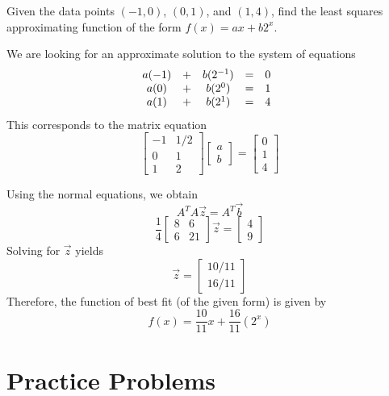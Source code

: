\documentclass{ximera}
\begin{document}
 \begin{example}\label{ex:leastSq3}
     Given the data points $(-1, 0)$, $(0,1)$, and $(1,4)$, find the least squares approximating function of the form $f(x)=ax+b2^x$.
\begin{explanation}
    We are looking for an approximate solution to the system of equations
    $$\begin{matrix}a(-1)&+&b(2^{-1})&=&0\\a(0)&+&b(2^{0})&=&1\\a(1)&+&b(2^{1})&=&4\end{matrix}\\$$
    This corresponds to the matrix equation
    $$\begin{bmatrix}-1&1/2\\0&1\\1&2\end{bmatrix}\begin{bmatrix}a\\b\end{bmatrix}=\begin{bmatrix}0\\1\\4\end{bmatrix}$$

    Using the normal equations, we obtain
    $$A^TA\vec{z}=A^T\vec{b}$$
    $$\frac{1}{4}\begin{bmatrix}8&6\\6&21\end{bmatrix}\vec{z}=\begin{bmatrix}4\\9\end{bmatrix}$$
Solving for $\vec{z}$ yields
$$\vec{z}=\begin{bmatrix}10/11\\16/11\end{bmatrix}$$
Therefore, the function of best fit (of the given form) is given by $$f(x)=\frac{10}{11}x+\frac{16}{11}(2^x)$$

\begin{onlineOnly}
\begin{center}
\end{center}
\end{onlineOnly}
\end{explanation}
 \end{example}

\section*{Practice Problems}
\end{document}
